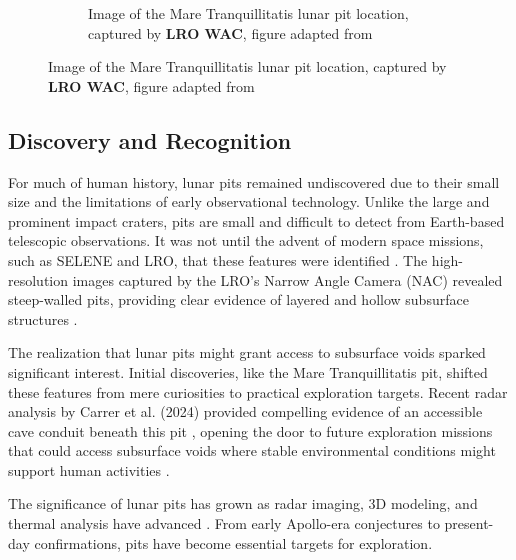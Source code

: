 \begin{figure}[h!]
\begin{subfigure}[c]{0.4\linewidth}
        \caption{Image of the Mare Tranquillitatis lunar pit location, captured by \textbf{LRO WAC}, figure adapted from \cite{sublunear-lava}}
        \label{fig:image2}
    \end{subfigure}
\end{figure}



\subsection{Discovery and Recognition}
For much of human history, lunar pits remained undiscovered due to their small size and the limitations of early observational technology. Unlike the large and prominent impact craters, pits are small and difficult to detect from Earth-based telescopic observations. It was not until the advent of modern space missions, such as SELENE and LRO, that these features were identified \cite{lunar-pit-distribution}. The high-resolution images captured by the LRO’s Narrow Angle Camera (NAC) revealed steep-walled pits, providing clear evidence of layered and hollow subsurface structures \cite{sublunear-lava, new-wagner, lunar-pit-distribution}.

The realization that lunar pits might grant access to subsurface voids sparked significant interest. Initial discoveries, like the Mare Tranquillitatis pit, shifted these features from mere curiosities to practical exploration targets. Recent radar analysis by Carrer et al. (2024) provided compelling evidence of an accessible cave conduit beneath this pit \cite{Carrer2024}, opening the door to future exploration missions that could access subsurface voids where stable environmental conditions might support human activities \cite{newer-thermal, thermal-lunar-pits, sublunear-lava}.

The significance of lunar pits has grown as radar imaging, 3D modeling, and thermal analysis have advanced \cite{Carrer2024, new-wagner, lunar-pit-distribution}. From early Apollo-era conjectures to present-day confirmations, pits have become essential targets for exploration.
